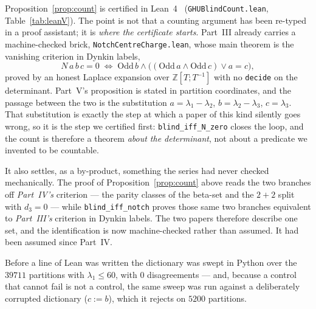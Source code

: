 \documentclass[11pt,a4paper]{article}
\begin{document}
Proposition~\ref{prop:count} is certified in Lean~4~\cite{Lean4} (\texttt{GHUBlindCount.lean},
Table~\ref{tab:leanV}). The point is not
that a counting argument has been re-typed in a proof assistant; it is \emph{where the certificate
starts}. Part~III already carries a machine-checked brick, \texttt{NotchCentreCharge.lean}, whose
main theorem is the vanishing criterion in Dynkin labels,
\[
N\,a\,b\,c=0\;\Longleftrightarrow\;\mathrm{Odd}\,b\wedge\big((\mathrm{Odd}\,a\wedge\mathrm{Odd}\,c)\vee a=c\big),
\]
proved by an honest Laplace expansion over $\mathbb{Z}[T;T^{-1}]$ with no \texttt{decide} on the
determinant. Part~V's proposition is stated in partition coordinates, and the passage between the
two is the substitution $a=\lambda_1-\lambda_2$, $b=\lambda_2-\lambda_3$, $c=\lambda_3$. That
substitution is exactly the step at which a paper of this kind silently goes wrong, so it is the
step we certified first: \texttt{blind\_iff\_N\_zero} closes the loop, and the count is therefore a
theorem \emph{about the determinant}, not about a predicate we invented to be countable.

It also settles, as a by-product, something the series had never checked mechanically. The proof of
Proposition~\ref{prop:count} above reads the two branches off \emph{Part~IV's} criterion --- the
parity classes of the beta-set and the $2{+}2$ split with $d_3=0$ --- while \texttt{blind\_iff\_notch}
proves those same two branches equivalent to \emph{Part~III's} criterion in Dynkin labels. The two
papers therefore describe one set, and the identification is now machine-checked rather than
assumed. It had been assumed since Part~IV.

Before a line of Lean was written the dictionary was swept in Python over the $39711$ partitions
with $\lambda_1\le 60$, with $0$ disagreements --- and, because a control that cannot fail is not a
control, the same sweep was run against a deliberately corrupted dictionary ($c:=b$), which it
rejects on $5200$ partitions.
\end{document}

